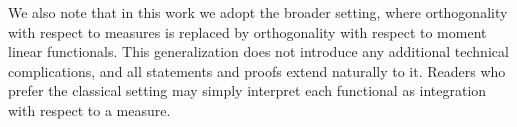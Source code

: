 \documentclass[reqno,centertags,11pt,draft]{amsart}
\begin{document}




We also note that in this work we adopt the broader setting, where orthogonality with respect to measures is replaced by orthogonality with respect to moment linear functionals. This generalization does not introduce any additional technical complications, and all statements and proofs extend naturally to it.  Readers who prefer the classical setting may simply interpret each functional as integration with respect to a measure. 
\end{document}
